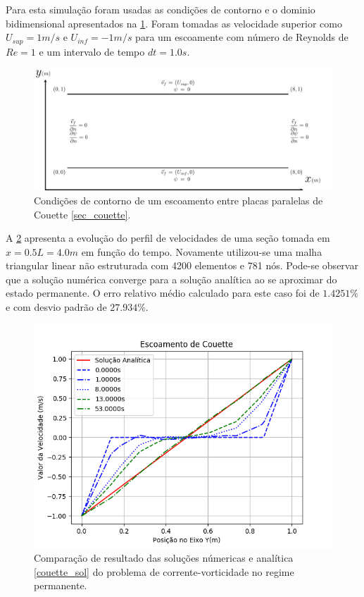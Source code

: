 Para esta simulação foram usadas as condições de contorno e o dominio bidimensional apresentados na \ref{couette_bc}.
Foram tomadas as velocidade superior como $U_{sup}=1m/s$ e $U_{inf}=-1m/s$ para um escoamente com número de Reynolds de $Re=1$ e um intervalo de tempo $dt=1.0s$.
\begin{figure}[H]
    \centering
    \includegraphics[width=\linewidth]{figures/Couette_boundary_conditions.pdf}
    \caption{Condições de contorno de um escoamento entre placas paralelas de Couette \ref{sec_couette}.}
    \label{couette_bc}
\end{figure}

A \ref{couette_comp} apresenta a evolução do perfil de velocidades de uma seção tomada em $x=0.5L=4.0m$ em função do tempo.
Novamente utilizou-se uma malha triangular linear não estruturada com 4200 elementos e 781 nós.
Pode-se observar que a solução numérica converge para a solução analítica ao se aproximar do estado permanente.
O erro relativo médio calculado para este caso foi de $1.4251\%$ e com desvio padrão de $27.934\%$.
\begin{figure}[H]
    \centering
    \includegraphics[width=.7\linewidth]{figures/Couette_validation.png}
    \caption{Comparação de resultado das soluções númericas e analítica \ref{couette_sol} do problema de corrente-vorticidade no regime permanente.}
    \label{couette_comp}
\end{figure}

